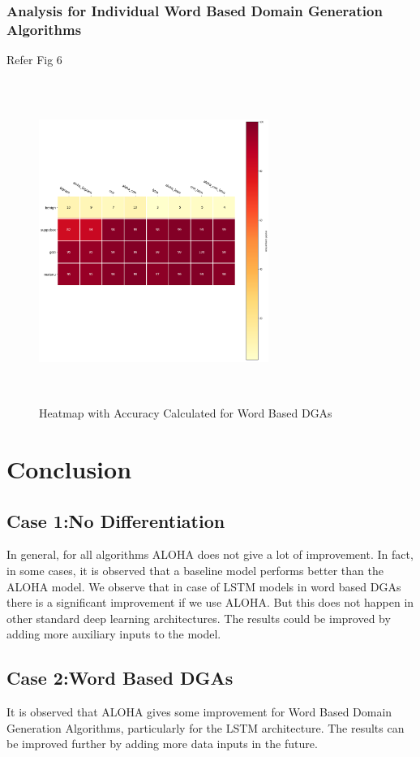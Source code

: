 \documentclass[conference]{IEEEtran}
\begin{document}
\subsubsection{Analysis for Individual Word Based Domain Generation Algorithms}
Refer Fig 6 \\
\begin{figure}[!h]
\centerline{\includegraphics[width=7.5cm,height=10.5cm,keepaspectratio]{heatmap_word.png}}
\caption{Heatmap with Accuracy Calculated for Word Based DGAs  }
\label{fig}
\end{figure}



\section{Conclusion}
\subsection{Case 1:No Differentiation}
In general, for all algorithms ALOHA does not give a lot of improvement. In fact, in some cases, it is observed that a baseline model performs better than the ALOHA model. We observe that in case of LSTM models in word based DGAs there is a significant improvement if we use ALOHA. But this does not happen in other standard deep learning architectures. The results could be improved by adding more auxiliary inputs to the model. 

\subsection{Case 2:Word Based DGAs}
It is observed that ALOHA gives some improvement for Word Based Domain Generation Algorithms, particularly for the LSTM architecture. The results can be improved further by adding more data inputs in the future. 
\end{document}
